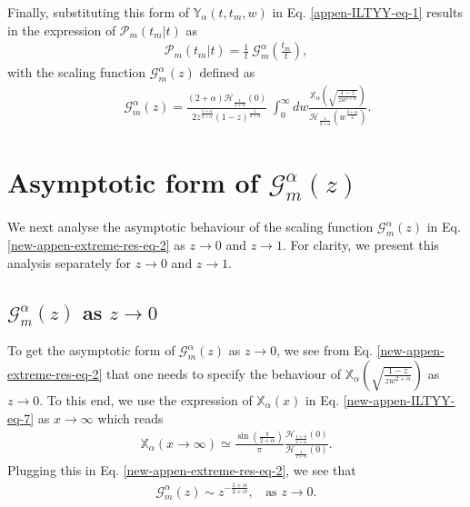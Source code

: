 \documentclass[superscriptaddress,amsmath,amssymb,aps,onecolumn]{revtex4}
\begin{document}
Finally, substituting this form of $\mathbb{Y}_{\alpha} \left(t,t_m,w \right)$ in Eq. \eqref{appen-ILTYY-eq-1} results in the expression of $\mathcal{P}_m(t_m|t)$ as
\begin{align}
\mathcal{P}_m(t_m|t) = \frac{1}{t} ~\mathcal{G} _{m}^{\alpha} \left( \frac{t_m}{t}\right),
\label{new-appen-extreme-res-eq-1}
\end{align}
with the scaling function $\mathcal{G} _{m}^{\alpha} \left( z \right)$ defined as
\begin{align}
~~~~~~~~\mathcal{G} _{m}^{\alpha} \left( z \right) = \frac{(2+\alpha)\mathcal{H}_{\frac{1}{2+\alpha}} \left(0 \right)}{2z^{\frac{1+\alpha}{2+\alpha}} (1-z)^{\frac{1}{2+\alpha}}}~\int _{0}^{\infty} dw\frac{\mathbb{X}_{\alpha} \left( \sqrt{\frac{1-z}{z w^{2+\alpha}}} \right)}{\mathcal{H}_{\frac{1}{2+\alpha}}\left( w^{\frac{2+\alpha}{2}}\right)}.
\label{new-appen-extreme-res-eq-2}
\end{align}


\section{Asymptotic form of $\mathcal{G}_m^{\alpha}(z)$}
\label{apen-Gm}
We next analyse the asymptotic behaviour of the scaling function $\mathcal{G}_m^{\alpha}(z)$ in Eq. \eqref{new-appen-extreme-res-eq-2} as $z \to 0$ and $z \to 1$. For clarity, we present this analysis separately for $z \to 0$ and $z \to 1$.
\subsection{$\mathcal{G}_m^{\alpha}(z)$ as $z \to 0$}
To get the asymptotic form of $\mathcal{G}_m^{\alpha}(z)$ as $z \to 0$, we see from Eq. \eqref{new-appen-extreme-res-eq-2} that one needs to specify the behaviour of $\mathbb{X}_{\alpha} \left( \sqrt{\frac{1-z}{z w^{2+\alpha}}} \right)$ as $z \to 0$. To this end, we use the expression of $\mathbb{X}_{\alpha}(x)$ in Eq. \eqref{new-appen-ILTYY-eq-7} as $x \to \infty$ which reads
\begin{align}
\mathbb{X}_{\alpha}\left(x \to \infty \right) \simeq \frac{\sin \left( \frac{\pi}{2+\alpha}\right)}{ \pi} \frac{\mathcal{H}_{\frac{1+\alpha}{2+\alpha}}(0)}{\mathcal{H}_{\frac{1}{2+\alpha}}(0)}.
\end{align}  
Plugging this in Eq. \eqref{new-appen-extreme-res-eq-2}, we see that
\begin{align}
\mathcal{G}_m^{\alpha}(z) \sim z^{-\frac{1+\alpha}{2+\alpha}}, ~~~~\text{as } z \to 0.
\end{align}
\end{document}
